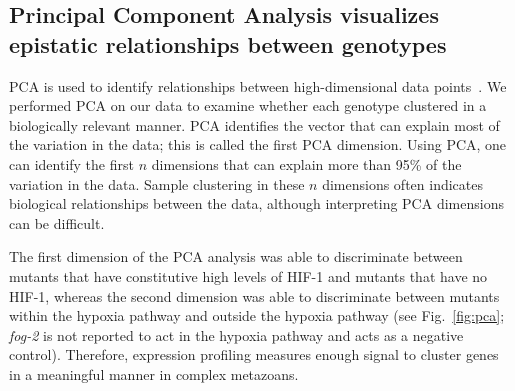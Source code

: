\documentclass[9pt,twocolumn,twoside]{pnas-new}
\newcommand{\gene}[1]{\mbox{\emph{#1}}}
\newcommand{\fog}{\gene{fog-2(lf)}}
\newcommand{\egl}{\gene{egl-9(lf)}}
\newcommand{\rhy}{\gene{rhy-1(lf)}}
\newcommand{\vhl}{\gene{vhl-1(lf)}}
\newcommand{\eglvhl}{\gene{egl-9(lf); vhl-1(lf)}}
\newcommand{\eglhif}{\gene{egl-9(lf) hif-1(lf)}}
\newcommand{\hif}{\gene{hif-1(lf)}}
\newcommand{\hifp}{HIF-1}
\begin{document}
\subsection*{Principal Component Analysis visualizes epistatic relationships
             between genotypes}
\label{sub:Clustering}

PCA is used to identify relationships between high-dimensional data
points~\cite{Yeung2001}. We performed PCA on our data to examine whether each
genotype clustered in a biologically relevant manner. PCA identifies the vector
that can explain most of the variation in the data; this is called the first PCA
dimension. Using PCA, one can identify the first $n$ dimensions that can explain
more than 95\% of the variation in the data. Sample clustering in these $n$
dimensions often indicates biological relationships between the data, although
interpreting PCA dimensions can be difficult.


The first dimension of the PCA analysis was able to discriminate between mutants
that have constitutive high levels of \hifp{} and mutants that have no \hifp{},
whereas the second dimension was able to discriminate between mutants within the
hypoxia pathway and outside the hypoxia pathway (see Fig.~\ref{fig:pca};
\gene{fog-2} is not reported to act in the hypoxia pathway and acts as a
negative control). Therefore, expression profiling measures enough signal to
cluster genes in a meaningful manner in complex metazoans.
\end{document}
